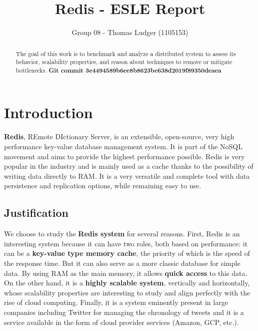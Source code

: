 \documentclass[runningheads]{llncs}
\begin{document}
\title{Redis - ESLE Report}
\author{Group 08 - Thomas Ludger (1105153)}
\maketitle
\begin{abstract}
The goal of this work is to benchmark and analyze a distributed system to assess its behavior, scalability properties, and reason about techniques to remove or mitigate bottlenecks. \textbf{Git commit 3e4494589b6ee8b8623be638d2019f89350deaea}

\end{abstract}

\section{Introduction}
\textbf{Redis}, REmote DIctionary Server, is an extensible, open-source, very high performance key-value database management system. It is part of the NoSQL movement and aims to provide the highest performance possible. Redis is very popular in the industry and is mainly used as a cache thanks to the possibility of writing data directly to RAM. It is a very versatile and complete tool with data persistence and replication options, while remaining easy to use.

\subsection{Justification}
We choose to study the \textbf{Redis system} for several reasons. First, Redis is an interesting system because it can have two roles, both based on performance: it can be a \textbf{key-value type memory cache}, the priority of which is the speed of the response time. But it can also serve as a more classic database for simple data. By using RAM as the main memory, it allows \textbf{quick access} to this data.
On the other hand, it is a \textbf{highly scalable system}, vertically and horizontally, whose scalability properties are interesting to study and align perfectly with the rise of cloud computing.
Finally, it is a system eminently present in large companies including Twitter for managing the chronology of tweets and it is a service available in the form of cloud provider services (Amazon, GCP, etc.).

\newpage
\end{document}
